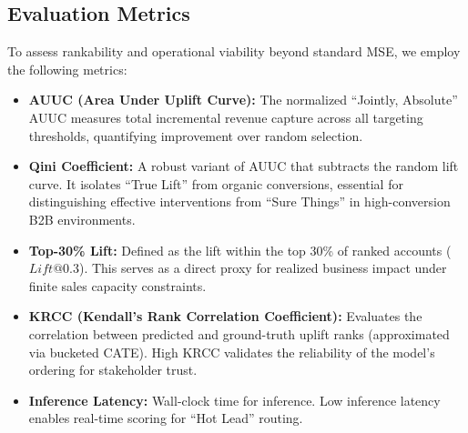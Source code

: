 \documentclass[runningheads]{llncs}
\begin{document}
\subsection{Evaluation Metrics}
To assess rankability and operational viability beyond standard MSE, we employ the following metrics:

\begin{itemize}
    \item \textbf{AUUC (Area Under Uplift Curve):} The normalized ``Jointly, Absolute''\cite{devriendt2020learning} AUUC measures total incremental revenue capture across all targeting thresholds, quantifying improvement over random selection.
    \item \textbf{Qini Coefficient:} A robust variant of AUUC that subtracts the random lift curve. It isolates ``True Lift'' from organic conversions, essential for distinguishing effective interventions from ``Sure Things'' in high-conversion B2B environments.
    \item \textbf{Top-30\% Lift:} Defined as the lift within the top 30\% of ranked accounts ($Lift@0.3$). This serves as a direct proxy for realized business impact under finite sales capacity constraints.
    \item \textbf{KRCC (Kendall's Rank Correlation Coefficient)\cite{abdi2007kendall}:} Evaluates the correlation between predicted and ground-truth uplift ranks (approximated via bucketed CATE). High KRCC validates the reliability of the model's ordering for stakeholder trust.
    \item \textbf{Inference Latency:} Wall-clock time for inference. Low inference latency enables real-time scoring for ``Hot Lead'' routing.
\end{itemize}


\end{document}

